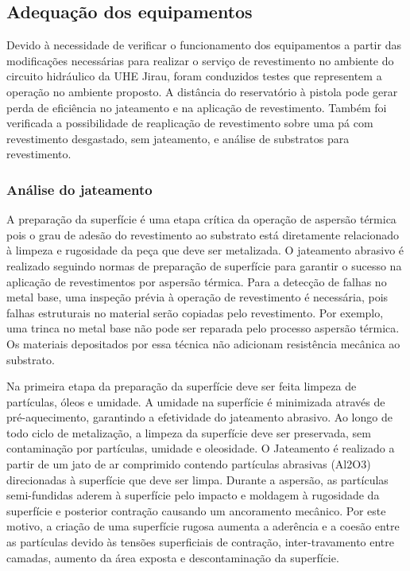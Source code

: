 \subsection{Adequação dos equipamentos}
Devido à necessidade de verificar o funcionamento dos equipamentos a partir das
modificações necessárias para realizar o serviço de revestimento no ambiente do
circuito hidráulico da UHE Jirau, foram conduzidos testes que representem a
operação no ambiente proposto. A distância do reservatório à pistola pode gerar
perda de eficiência no jateamento e na aplicação de revestimento. Também foi
verificada a possibilidade de reaplicação de revestimento sobre
uma pá com revestimento desgastado, sem jateamento, e análise de substratos
para revestimento.

\subsubsection{Análise do jateamento}
A preparação da superfície é uma etapa crítica da operação de aspersão térmica
pois o grau de adesão do revestimento ao substrato está diretamente relacionado
à limpeza e rugosidade da peça que deve ser metalizada. O jateamento abrasivo é
realizado seguindo normas de preparação de superfície para garantir o sucesso
na aplicação de revestimentos por aspersão térmica. Para a detecção de falhas no
metal base, uma inspeção prévia à operação de revestimento é necessária, pois
falhas estruturais no material serão copiadas pelo revestimento. Por exemplo,
uma trinca no metal base não pode ser reparada pelo processo aspersão
térmica. Os materiais depositados por essa técnica não adicionam resistência
mecânica ao substrato.

Na primeira etapa da preparação da superfície deve ser feita limpeza de
partículas, óleos e umidade. A umidade na superfície é minimizada através
de pré-aquecimento, garantindo a efetividade do jateamento abrasivo. Ao longo de
todo ciclo de metalização, a limpeza da superfície deve ser preservada, sem
contaminação por partículas, umidade e oleosidade. O Jateamento é realizado a
partir de um jato de ar comprimido contendo partículas abrasivas (Al2O3)
direcionadas à superfície que deve ser limpa. Durante a aspersão, as partículas
semi-fundidas aderem à superfície pelo impacto e moldagem à rugosidade da
superfície e posterior contração causando um ancoramento mecânico. Por este
motivo, a criação de uma superfície rugosa aumenta a aderência e a coesão entre
as partículas devido às tensões superficiais de contração, inter-travamento
entre camadas, aumento da área exposta e descontaminação da superfície.


